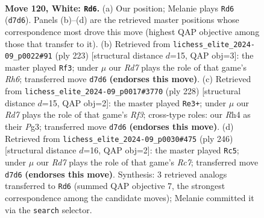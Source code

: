 \documentclass[11pt]{article}
\begin{document}
\clearpage

\begin{figure}[p]\centering
\begin{subfigure}{0.46\textwidth}\centering
\resizebox{\linewidth}{!}{%
\newchessgame
\chessboard[
  setfen={1kr5/3R4/4p3/4P3/5P1R/8/8/5K2 w - - 25 120},
  showmover=false,
  pgfstyle=straightmove, color=movearrow, markmove={d7-d6}
]}
\caption{}
\end{subfigure}\hfill
\begin{subfigure}{0.46\textwidth}\centering
\resizebox{\linewidth}{!}{%
\newchessgame
\chessboard[
  setfen={8/8/6k1/5p2/5P2/7r/8/3RK3 b - - 93 112},
  showmover=false,
  pgfstyle=straightmove, color=movearrow, markmove={h3-f3}
]}
\caption{}
\end{subfigure}
\\[4pt]
\begin{subfigure}{0.46\textwidth}\centering
\resizebox{\linewidth}{!}{%
\newchessgame
\chessboard[
  setfen={8/r7/4k1p1/7p/7P/5RP1/8/6K1 w - - 66 115},
  showmover=false,
  pgfstyle=straightmove, color=movearrow, markmove={f3-e3}
]}
\caption{}
\end{subfigure}\hfill
\begin{subfigure}{0.46\textwidth}\centering
\resizebox{\linewidth}{!}{%
\newchessgame
\chessboard[
  setfen={8/2R5/5k2/7p/7P/6P1/6K1/1r6 w - - 93 124},
  showmover=false,
  pgfstyle=straightmove, color=movearrow, markmove={c7-c5}
]}
\caption{}
\end{subfigure}
\caption{\textbf{Move 120, White: \texttt{Rd6}.} (a) Our position; Melanie plays \texttt{Rd6} (\texttt{d7d6}). Panels (b)--(d) are the retrieved master positions whose correspondence most drove this move (highest QAP objective among those that transfer to it). (b) Retrieved from \texttt{lichess\_elite\_2024-09\_p0022\#91} (ply 223) [structural distance $d$=15, QAP obj=3]: the master played \texttt{Rf3}; under $\mu$ our \emph{Rd7} plays the role of that game's \emph{Rh6}; transferred move \texttt{d7d6} \textbf{(endorses this move)}. (c) Retrieved from \texttt{lichess\_elite\_2024-09\_p0017\#3770} (ply 228) [structural distance $d$=15, QAP obj=2]: the master played \texttt{Re3+}; under $\mu$ our \emph{Rd7} plays the role of that game's \emph{Rf3}; cross-type roles: our \emph{R}h4 as their \emph{P}g3; transferred move \texttt{d7d6} \textbf{(endorses this move)}. (d) Retrieved from \texttt{lichess\_elite\_2024-09\_p0030\#475} (ply 246) [structural distance $d$=16, QAP obj=2]: the master played \texttt{Rc5}; under $\mu$ our \emph{Rd7} plays the role of that game's \emph{Rc7}; transferred move \texttt{d7d6} \textbf{(endorses this move)}. Synthesis: 3 retrieved analogs transferred to \texttt{Rd6} (summed QAP objective 7, the strongest correspondence among the candidate moves); Melanie committed it via the \texttt{search} selector.}
\label{fig:thought-m238}
\end{figure}
\end{document}
